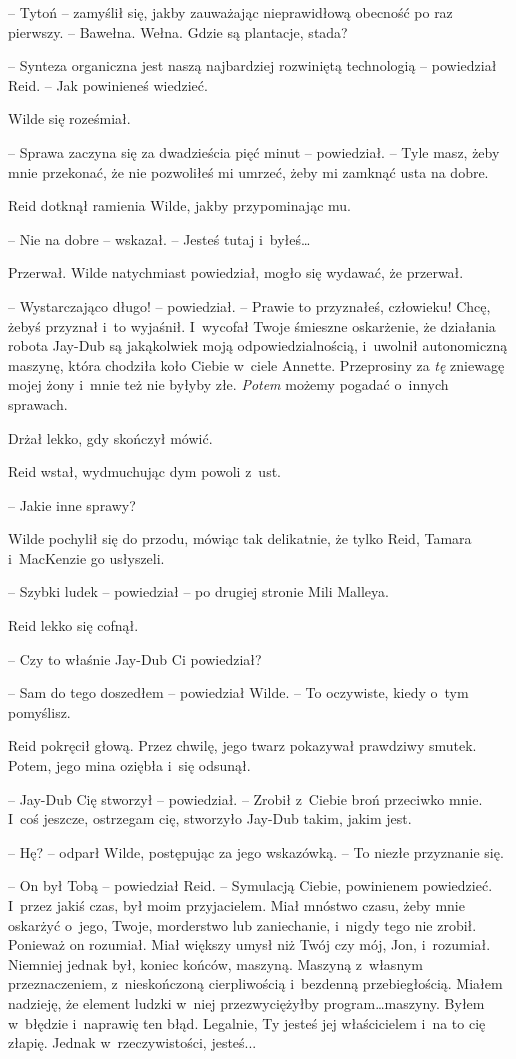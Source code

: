 \documentclass[oneside,polish,11pt,sfheadings]{mwbk}
\begin{document}
-- Tytoń -- zamyślił się, jakby zauważając nieprawidłową obecność po raz
pierwszy. -- Bawełna. Wełna. Gdzie są plantacje, stada?

-- Synteza organiczna jest naszą najbardziej rozwiniętą technologią -- powiedział Reid. -- Jak powinieneś wiedzieć.

Wilde się roześmiał. 

-- Sprawa zaczyna się za dwadzieścia pięć minut -- powiedział. -- Tyle masz, żeby mnie przekonać, że nie pozwoliłeś mi
umrzeć, żeby mi zamknąć usta na dobre.

Reid dotknął ramienia Wilde, jakby przypominając mu.

-- Nie na dobre -- wskazał. -- Jesteś tutaj i~byłeś\ldots

Przerwał. Wilde natychmiast powiedział, mogło się wydawać, że przerwał.

-- Wystarczająco długo! -- powiedział. -- Prawie to przyznałeś, człowieku!
Chcę, żebyś przyznał i~to wyjaśnił. I~wycofał Twoje śmieszne oskarżenie,
że działania robota Jay-Dub są jakąkolwiek moją odpowiedzialnością, i~uwolnił autonomiczną maszynę, która chodziła koło Ciebie w~ciele
Annette. Przeprosiny za \emph{tę} zniewagę mojej żony i~mnie też nie
byłyby złe. \emph{Potem} możemy pogadać o~innych sprawach.

Drżał lekko, gdy skończył mówić.

Reid wstał, wydmuchując dym powoli z~ust.

-- Jakie inne sprawy?

Wilde pochylił się do przodu, mówiąc tak delikatnie, że tylko Reid,
Tamara i~MacKenzie go usłyszeli.

-- Szybki ludek -- powiedział -- po drugiej stronie Mili Malleya.

Reid lekko się cofnął. 

-- Czy to właśnie Jay-Dub Ci powiedział?

-- Sam do tego doszedłem -- powiedział Wilde. -- To oczywiste, kiedy o~tym
pomyślisz.

Reid pokręcił głową. Przez chwilę, jego twarz pokazywał prawdziwy
smutek. Potem, jego mina oziębła i~się odsunął.

-- Jay-Dub Cię stworzył -- powiedział. -- Zrobił z~Ciebie broń przeciwko
mnie. I~coś jeszcze, ostrzegam cię, stworzyło Jay-Dub takim, jakim jest.

-- Hę? -- odparł Wilde, postępując za jego wskazówką. -- To niezłe
przyznanie się.

-- On był Tobą -- powiedział Reid. -- Symulacją Ciebie, powinienem
powiedzieć. I~przez jakiś czas, był moim przyjacielem. Miał mnóstwo
czasu, żeby mnie oskarżyć o~jego, Twoje, morderstwo lub zaniechanie, i~nigdy tego nie zrobił. Ponieważ on rozumiał. Miał większy umysł niż Twój
czy mój, Jon, i~rozumiał. Niemniej jednak był, koniec końców, maszyną.
Maszyną z~własnym przeznaczeniem, z~nieskończoną cierpliwością i~bezdenną przebiegłością. Miałem nadzieję, że element ludzki w~niej
przezwyciężyłby program\ldots maszyny. Byłem w~błędzie i~naprawię ten błąd.
Legalnie, Ty jesteś jej właścicielem i~na to cię złapię. Jednak w~rzeczywistości, jesteś...
\end{document}
